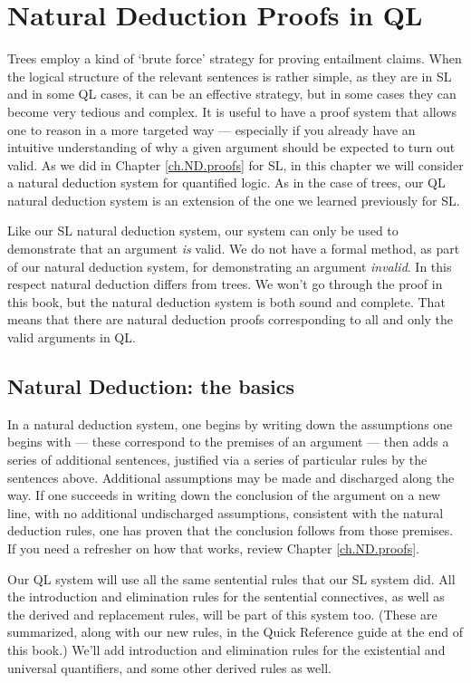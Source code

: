 \chapter{Natural Deduction Proofs in QL}
\label{ch.QLND}


Trees employ a kind of `brute force' strategy for proving entailment claims. When the logical structure of the relevant sentences is rather simple, as they are in SL and in some QL cases, it can be an effective strategy, but in some cases they can become very tedious and complex. It is useful to have a proof system that allows one to reason in a more targeted way --- especially if you already have an intuitive understanding of why a given argument should be expected to turn out valid. As we did in Chapter \ref{ch.ND.proofs} for SL, in this chapter we will consider a natural deduction system for quantified logic. As in the case of trees, our QL natural deduction system is an extension of the one we learned previously for SL.

Like our SL natural deduction system, our system can only be used to demonstrate that an argument \emph{is} valid. We do not have a formal method, as part of our natural deduction system, for demonstrating an argument \emph{invalid}. In this respect natural deduction differs from trees. We won't go through the proof in this book, but the natural deduction system is both sound and complete. That means that there are natural deduction proofs corresponding to all and only the valid arguments in QL.

\section{Natural Deduction: the basics}

In a natural deduction system, one begins by writing down the assumptions one begins with --- these correspond to the premises of an argument --- then adds a series of additional sentences, justified via a series of particular rules by the sentences above. Additional assumptions may be made and discharged along the way. If one succeeds in writing down the conclusion of the argument on a new line, with no additional undischarged assumptions, consistent with the natural deduction rules, one has proven that the conclusion follows from those premises. If you need a refresher on how that works, review Chapter \ref{ch.ND.proofs}.

Our QL system will use all the same sentential rules that our SL system did. All the introduction and elimination rules for the sentential connectives, as well as the derived and replacement rules, will be part of this system too. (These are summarized, along with our new rules, in the Quick Reference guide at the end of this book.) We'll add introduction and elimination rules for the existential and universal quantifiers, and some other derived rules as well.


